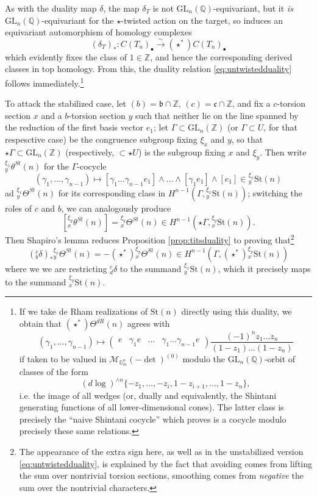 \documentclass[10pt]{amsart}
\theoremstyle{definition}
\newcommand{\Z}{\mathbb{Z}}
\newcommand{\Q}{\mathbb{Q}}
\renewcommand{\c}{\mathfrak{c}}
\renewcommand{\b}{\mathfrak{b}}
\newcommand{\St}{\mathrm{St}}
\newcommand{\G}{\mathbb{G}}
\newcommand{\GL}{\mathrm{GL}}
\numberwithin{equation}{section}
\begin{document}
As with the duality map $\delta$, the map $\delta_T$ is not $\GL_n(\Q)$-equivariant, but it \emph{is} $\GL_n(\Q)$-equivariant for the $\star$-twisted action on the target, so induces an equivariant automorphism of homology complexes
\[
(\delta_T)_*: C(T_n)_\bullet \xrightarrow{\sim} (\star^*)C(T_n)_\bullet
\]
which evidently fixes the class of $1\in \Z$, and hence the corresponding derived classes in top homology. From this, the duality relation \eqref{eq:untwistedduality} follows immediately.\footnote{If we take de Rham realizations of $\St(n)$ directly using this duality, we obtain that $(\star^*)\Theta^{dR}(n)$ agrees with 
\[
(\gamma_1,\ldots, \gamma_{n-1})\mapsto \begin{pmatrix} e & \gamma_1 e & \ldots & \gamma_1 \ldots \gamma_{n-1}e\end{pmatrix} \frac{(-1)^nz_1\ldots z_n}{(1-z_1)\ldots (1-z_n)}
\]
if taken to be valued in $\mathcal{M}_{\G_m^n}(-\det)^{(0)}$ modulo the $\GL_n(\Q)$-orbit of classes of the form
\[
(d\log)^{\wedge n} \{-z_1, \ldots, -z_i, 1-z_{i+1},\ldots, 1-z_n\},
\]
i.e. the image of all wedges (or, dually and equivalently, the Shintani generating functions of all lower-dimensional cones). The latter class is precisely the ``naive Shintani cocycle'' which \cite{LP} proves is a cocycle modulo precisely these same relations.}

To attack the stabilized case, let $(b)=\b \cap \Z$, $(c)=\c \cap \Z$, and fix a $c$-torsion section $x$ and a $b$-torsion section $y$ such that neither lie on the line spanned by the reduction of the first basis vector $e_1$; let $\Gamma\subset \GL_n(\Z)$ (or $\Gamma\subset U$, for that respesctive case) be the congruence subgroup fixing $\xi_x$ and $y$, so that $\star\Gamma\subset \GL_n(\Z)$ (respectively, $\subset \star U$) is the subgroup fixing $x$ and $\xi_y$. Then write ${}^{\xi_x}_y\theta^{St}(n)$ for the $\Gamma$-cocycle
\[
    (\gamma_1,\ldots, \gamma_{n-1})\mapsto [\gamma_1 \ldots \gamma_{n-1} e_1] \wedge \ldots \wedge [\gamma_1 e_1]\wedge [e_1]\in {}^{\xi_x}_{y}\St(n)
\]
ad ${}^{\xi_x}_y\Theta^{St}(n)$ for its corresponding class in $H^{n-1}(\Gamma, {}^{\xi_x}_{y}\St(n))$; switching the roles of $c$ and $b$, we can analogously produce 
\[
[{}^{\xi_y}_x\theta^{St}(n)]={}^{\xi_y}_x\Theta^{St}(n)\in H^{n-1}(\star\Gamma, {}^{\xi_y}_{x}\St(n)).
\]
Then Shapiro's lemma reduces Proposition \ref{prop:titsduality} to proving that\footnote{The appearance of the extra sign here, as well as in the unstabilized version \eqref{eq:untwistedduality}, is explained by the fact that avoiding comes from lifting the sum over nontrivial torsion sections, smoothing comes from \emph{negative} the sum over the nontrivial characters.}
\begin{equation} \label{eq:xyreduction}
({}^c_b\delta)_* {}^{\xi_x}_y\Theta^{St}(n) = - (\star^*) {}^{\xi_y}_{x}\Theta^{St}(n)\in H^{n-1}(\Gamma, (\star^*){}^{\xi_y}_{x}\St(n))
\end{equation}
where we we are restricting ${}^c_d\delta$ to the summand ${}^{\xi_x}_{y}\St(n)$, which it precisely maps to the summand ${}^{\xi_y}_{x}\St(n)$. 
\end{document}

